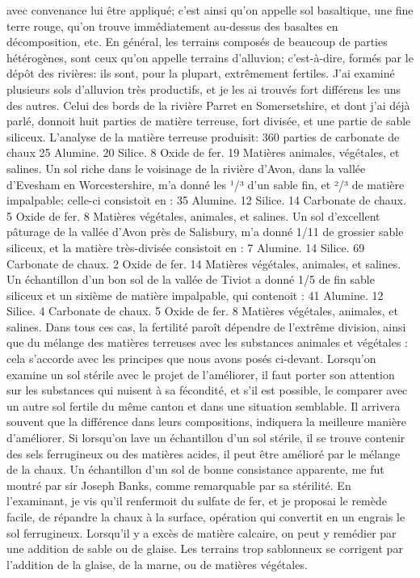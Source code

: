 avec convenance lui être appliqué; c'est ainsi qu'on appelle sol basaltique, une fine terre rouge, qu'on trouve immédiatement au-dessus des basaltes en décomposition, etc.
En général, les terrains composés de beaucoup de parties hétérogènes, sont ceux qu'on appelle terrains d'alluvion; c'est-à-dire, formés par le dépôt des rivières: ils sont, pour la plupart, extrêmement fertiles. J'ai examiné plusieurs sols d'alluvion très productifs, et je les ai trouvés fort différens les uns des autres. Celui des bords de la rivière Parret en Somersetshire, et dont j'ai déjà parlé, donnoit huit parties de matière terreuse, fort divisée, et une partie de sable siliceux. L'analyse de la matière terreuse produisit:
360 parties de carbonate de chaux
25 Alumine.
20 Silice.
8 Oxide de fer.
19 Matières animales, végétales, et salines.
Un sol riche dans le voisinage de la rivière d'Avon, dans la vallée d'Evesham en Worcestershire, m'a donné les ¹/³ d'un sable fin, et ²/³ de matière impalpable; celle-ci consistoit en :\setcounter{page}{483} 35 Alumine.
12 Silice.
14 Carbonate de chaux.
5 Oxide de fer.
8 Matières végétales, animales, et salines.
Un sol d'excellent pâturage de la vallée d'Avon près de Salisbury, m'a donné 1/11 de grossier sable siliceux, et la matière très-divisée consistoit en :
7 Alumine.
14 Silice.
69 Carbonate de chaux.
2 Oxide de fer.
14 Matières végétales, animales, et salines.
Un échantillon d'un bon sol de la vallée de Tiviot a donné 1/5 de fin sable siliceux et un sixième de matière impalpable, qui contenoit :
41 Alumine.
12 Silice.
4 Carbonate de chaux.
5 Oxide de fer.
8 Matières végétales, animales, et salines.
Dans tous ces cas, la fertilité paroît dépendre de l'extrême division, ainsi que du mélange des matières terreuses avec les substances animales et végétales : cela s'accorde\setcounter{page}{484} avec les principes que nous avons posés ci-devant.
Lorsqu'on examine un sol stérile avec le projet de l'améliorer, il faut porter son attention sur les substances qui nuisent à sa fécondité, et s'il est possible, le comparer avec un autre sol fertile du même canton et dans une situation semblable. Il arrivera souvent que la différence dans leurs compositions, indiquera la meilleure manière d'améliorer. Si lorsqu'on lave un échantillon d'un sol stérile, il se trouve contenir des sels ferrugineux ou des matières acides, il peut être amélioré par le mélange de la chaux.
Un échantillon d'un sol de bonne consistance apparente, me fut montré par sir Joseph Banks, comme remarquable par sa stérilité. En l'examinant, je vis qu'il renfermoit du sulfate de fer, et je proposai le remède facile, de répandre la chaux à la surface, opération qui convertit en un engrais le sol ferrugineux. Lorsqu'il y a excès de matière calcaire, on peut y remédier par une addition de sable ou de glaise. Les terrains trop sablonneux se corrigent par l'addition de la glaise, de la marne, ou de matières végétales.
